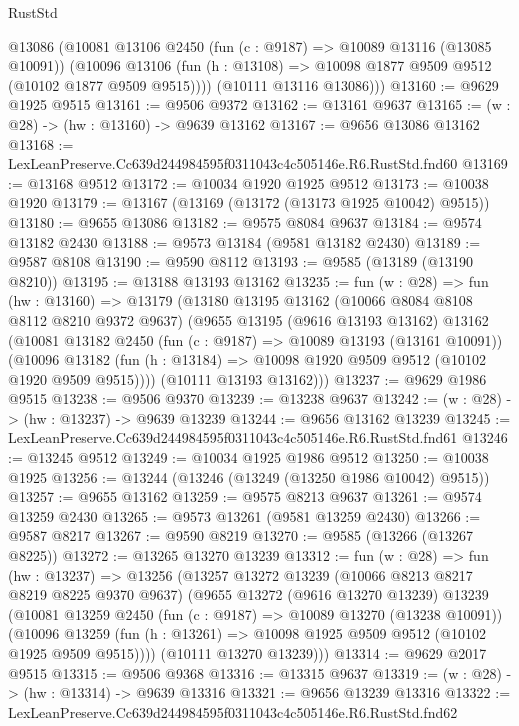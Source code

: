 \begin{lexlean}{RustStd}
\begin{coremodule}
        @13086
        (@10081
          @13106
          @2450
          (fun (c : @9187) => @10089 @13116 (@13085 @10091))
          (@10096 @13106 (fun (h : @13108) => @10098 @1877 @9509 @9512 (@10102 @1877 @9509 @9515))))
        (@10111 @13116 @13086)))
@13160 := @9629 @1925 @9515
@13161 := @9506 @9372
@13162 := @13161 @9637
@13165 := (w : @28) -> (hw : @13160) -> @9639 @13162
@13167 := @9656 @13086 @13162
@13168 := LexLeanPreserve.Cc639d244984595f0311043c4c505146e.R6.RustStd.fnd60
@13169 := @13168 @9512
@13172 := @10034 @1920 @1925 @9512
@13173 := @10038 @1920
@13179 := @13167 (@13169 (@13172 (@13173 @1925 @10042) @9515))
@13180 := @9655 @13086
@13182 := @9575 @8084 @9637
@13184 := @9574 @13182 @2430
@13188 := @9573 @13184 (@9581 @13182 @2430)
@13189 := @9587 @8108
@13190 := @9590 @8112
@13193 := @9585 (@13189 (@13190 @8210))
@13195 := @13188 @13193 @13162
@13235 := fun (w : @28) =>
  fun (hw : @13160) =>
  @13179
    (@13180
      @13195
      @13162
      (@10066 @8084 @8108 @8112 @8210 @9372 @9637)
      (@9655
        @13195
        (@9616 @13193 @13162)
        @13162
        (@10081
          @13182
          @2450
          (fun (c : @9187) => @10089 @13193 (@13161 @10091))
          (@10096 @13182 (fun (h : @13184) => @10098 @1920 @9509 @9512 (@10102 @1920 @9509 @9515))))
        (@10111 @13193 @13162)))
@13237 := @9629 @1986 @9515
@13238 := @9506 @9370
@13239 := @13238 @9637
@13242 := (w : @28) -> (hw : @13237) -> @9639 @13239
@13244 := @9656 @13162 @13239
@13245 := LexLeanPreserve.Cc639d244984595f0311043c4c505146e.R6.RustStd.fnd61
@13246 := @13245 @9512
@13249 := @10034 @1925 @1986 @9512
@13250 := @10038 @1925
@13256 := @13244 (@13246 (@13249 (@13250 @1986 @10042) @9515))
@13257 := @9655 @13162
@13259 := @9575 @8213 @9637
@13261 := @9574 @13259 @2430
@13265 := @9573 @13261 (@9581 @13259 @2430)
@13266 := @9587 @8217
@13267 := @9590 @8219
@13270 := @9585 (@13266 (@13267 @8225))
@13272 := @13265 @13270 @13239
@13312 := fun (w : @28) =>
  fun (hw : @13237) =>
  @13256
    (@13257
      @13272
      @13239
      (@10066 @8213 @8217 @8219 @8225 @9370 @9637)
      (@9655
        @13272
        (@9616 @13270 @13239)
        @13239
        (@10081
          @13259
          @2450
          (fun (c : @9187) => @10089 @13270 (@13238 @10091))
          (@10096 @13259 (fun (h : @13261) => @10098 @1925 @9509 @9512 (@10102 @1925 @9509 @9515))))
        (@10111 @13270 @13239)))
@13314 := @9629 @2017 @9515
@13315 := @9506 @9368
@13316 := @13315 @9637
@13319 := (w : @28) -> (hw : @13314) -> @9639 @13316
@13321 := @9656 @13239 @13316
@13322 := LexLeanPreserve.Cc639d244984595f0311043c4c505146e.R6.RustStd.fnd62

\end{coremodule}
\end{lexlean}
